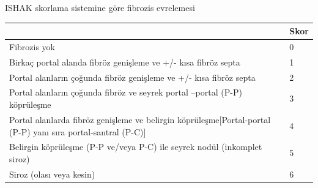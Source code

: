 \begin{minipage}[c]{\textwidth}
\renewcommand{\arraystretch}{1.1} %
\centering
\begin{threeparttable}
\caption[ISHAK skorlama sistemine göre fibrozis evrelemesi]{ISHAK skorlama sistemine göre fibrozis evrelemesi} \label{tablo:ishakfib} %
{\scriptsize \begin{tabular}{ll}
\toprule\toprule
\textbf{}                                                                                                        & \textbf{Skor} \\
\midrule
Fibrozis yok                                                                                                     & 0             \\
Birkaç portal alanda fibröz genişleme ve +/- kısa fibröz septa                                                   & 1             \\
Portal alanların çoğunda fibröz genişleme ve +/- kısa fibröz septa                                               & 2             \\
Portal alanların çoğunda fibröz ve seyrek portal –portal (P-P) köprüleşme                                        & 3             \\
Portal alanlarda fibröz genişleme ve belirgin köprüleşme{[}Portal-portal (P-P) yanı sıra portal-santral (P-C){]} & 4             \\
Belirgin köprüleşme (P-P ve/veya P-C) ile seyrek nodül (inkomplet siroz)                                         & 5             \\
Siroz (olası veya kesin)                                                                                         & 6      \\
\bottomrule    
\end{tabular}}
\begin{tablenotes}
\end{tablenotes}
\end{threeparttable}
\end{minipage}
     

